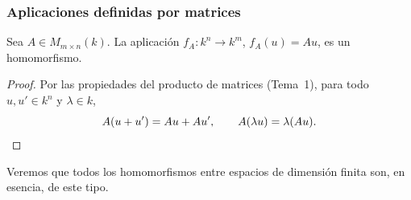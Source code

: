 \begin{frame}
    \frametitle{Aplicaciones definidas por matrices}

    \begin{proposition}
        Sea $A\in M_{m\times n}(k)$. La aplicación
        $f_A\colon k^n\to k^m$, $f_A(u)=Au$, es un homomorfismo.
    \end{proposition}

    \vspace{-6pt}

    \begin{proof}
        Por las propiedades del producto de matrices (Tema~1), para todo
        $u,u'\in k^n$ y $\lambda\in k$,
        \[
            A(u+u')=Au+Au',
            \qquad
            A(\lambda u)=\lambda(Au).\qedhere
        \]
    \end{proof}

    \vspace{-6pt}

    Veremos que \alert{todos} los homomorfismos entre espacios de
    dimensión finita son, en esencia, de este tipo.
\end{frame}


